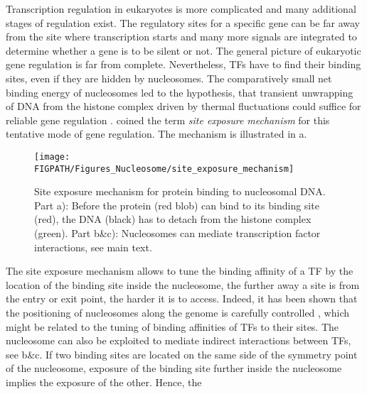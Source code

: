 Transcription regulation in eukaryotes is more complicated and many additional stages of regulation exist. 
The regulatory sites for a specific gene can be far away from the site where transcription starts and many more
signals are integrated to determine whether a gene is to be silent or not. The general picture of eukaryotic 
gene regulation is far from complete. Nevertheless, TFs have to find their binding sites,
even if they are hidden by nucleosomes. The comparatively small net binding 
energy of nucleosomes led to the hypothesis, that transient unwrapping of DNA from the histone complex
driven by thermal fluctuations could suffice for reliable gene regulation \cite{Polach_JMB_96}. 
\citeauthor{Polach_JMB_96} coined the term \emph{site exposure mechanism} for this tentative 
mode of gene regulation. The mechanism is illustrated in a. 
\begin{figure}
\centering
\texttt{[image: \\FIGPATH/Figures\_Nucleosome/site\_exposure\_mechanism]}
\caption[Site exposure mechanism]{\label{fig:site_exposure_mechanism}
Site exposure mechanism for protein binding to nucleosomal DNA.
Part a): Before the protein (red blob) can bind to its binding site (red), the DNA (black) has to detach from 
the histone complex (green). 
Part b\&c): Nucleosomes can mediate transcription factor interactions, see main text. 
}
\end{figure}
The site exposure mechanism allows to tune the binding affinity of a TF
 by the location of the binding site inside the nucleosome, the further away a site is from the 
entry or exit point, the harder it is to access. Indeed, it has been shown that the positioning
of nucleosomes along the genome is carefully controlled \cite{Segal_Nature_06}, which might be 
related to the tuning of binding affinities of TFs to their sites. The nucleosome can also be exploited
to mediate indirect interactions between TFs, see b\&c.
If two binding sites are located on the same side of the symmetry point of the nucleosome, exposure
of the binding site further inside the nucleosome implies the exposure of the other. Hence, the
